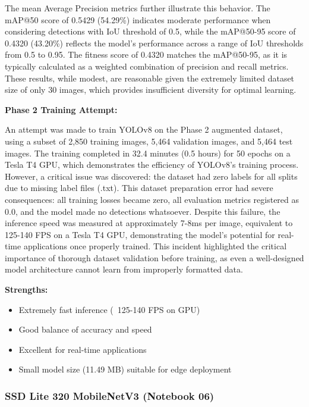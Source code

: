 \documentclass[12pt,a4paper]{article}
\begin{document}
The mean Average Precision metrics further illustrate this behavior. The mAP@50 score of 0.5429 (54.29\%) indicates moderate performance when considering detections with IoU threshold of 0.5, while the mAP@50-95 score of 0.4320 (43.20\%) reflects the model's performance across a range of IoU thresholds from 0.5 to 0.95. The fitness score of 0.4320 matches the mAP@50-95, as it is typically calculated as a weighted combination of precision and recall metrics. These results, while modest, are reasonable given the extremely limited dataset size of only 30 images, which provides insufficient diversity for optimal learning.

\textbf{Phase 2 Training Attempt:}

An attempt was made to train YOLOv8 on the Phase 2 augmented dataset, using a subset of 2,850 training images, 5,464 validation images, and 5,464 test images. The training completed in 32.4 minutes (0.5 hours) for 50 epochs on a Tesla T4 GPU, which demonstrates the efficiency of YOLOv8's training process. However, a critical issue was discovered: the dataset had zero labels for all splits due to missing label files (.txt). This dataset preparation error had severe consequences: all training losses became zero, all evaluation metrics registered as 0.0, and the model made no detections whatsoever. Despite this failure, the inference speed was measured at approximately 7-8ms per image, equivalent to 125-140 FPS on a Tesla T4 GPU, demonstrating the model's potential for real-time applications once properly trained. This incident highlighted the critical importance of thorough dataset validation before training, as even a well-designed model architecture cannot learn from improperly formatted data.

\textbf{Strengths:}
\begin{itemize}
    \item Extremely fast inference (~125-140 FPS on GPU)
    \item Good balance of accuracy and speed
    \item Excellent for real-time applications
    \item Small model size (11.49 MB) suitable for edge deployment
\end{itemize}

\subsubsection{SSD Lite 320 MobileNetV3 (Notebook 06)}
\end{document}
